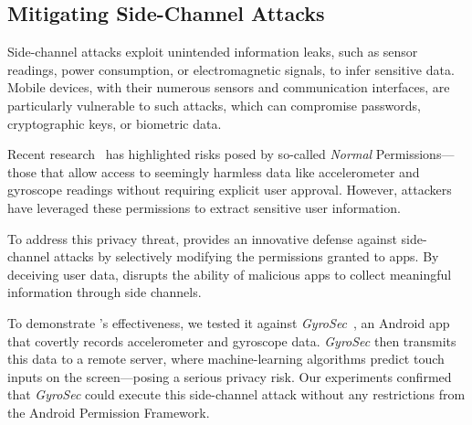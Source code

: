
\subsection{Mitigating Side-Channel Attacks}
\label{sec:side_channel_attack}
Side-channel attacks exploit unintended information leaks, such as sensor readings, power consumption, or electromagnetic signals, to infer sensitive data. Mobile devices, with their numerous sensors and communication interfaces, are particularly vulnerable to such attacks, which can compromise passwords, cryptographic keys, or biometric data.

Recent research~\cite{hasan2013sensing, simon2013pin, ba2020learning, shen2015input} has highlighted risks posed by so-called \textit{Normal} Permissions—those that allow access to seemingly harmless data like accelerometer and gyroscope readings without requiring explicit user approval. However, attackers have leveraged these permissions to extract sensitive user information.

To address this privacy threat, \framework{} provides an innovative defense against side-channel attacks by selectively modifying the permissions granted to apps. By deceiving user data, \framework{} disrupts the ability of malicious apps to collect meaningful information through side channels.

To demonstrate \framework{}'s effectiveness, we tested it against \textit{GyroSec}~\cite{lin2019motion}, an Android app that covertly records accelerometer and gyroscope data. \textit{GyroSec} then transmits this data to a remote server, where machine-learning algorithms predict touch inputs on the screen—posing a serious privacy risk. Our experiments confirmed that \textit{GyroSec} could execute this side-channel attack without any restrictions from the Android Permission Framework.

